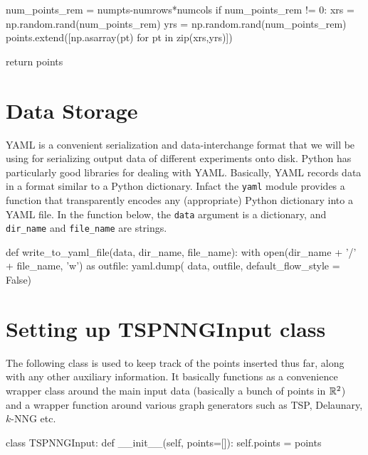      num_points_rem = numpts-numrows*numcols
     if num_points_rem != 0:
          xrs = np.random.rand(num_points_rem)
          yrs = np.random.rand(num_points_rem)
          points.extend([np.asarray(pt) for pt in zip(xrs,yrs)])
     
     return points
\nwendcode{}\nwdocspar

\section{Data Storage}
YAML\cite{ben2009yaml} is a convenient serialization and data-interchange format that we will be using 
for serializing output data of different experiments onto disk. Python has particularly good libraries for dealing with YAML. Basically, 
YAML records data in a format similar to a Python dictionary. Infact the \texttt{yaml} module provides a function that
transparently encodes any (appropriate) Python dictionary into a YAML file. In the function below, the 
\texttt{data} argument is a dictionary, and \texttt{dir\_name} and \texttt{file\_name} are strings. 
 
\nwenddocs{}\plusendmoddef\nwstartdeflinemarkup{}\nwenddeflinemarkup
def write_to_yaml_file(data, dir_name, file_name):
   with open(dir_name + '/' + file_name, 'w') as outfile:
          yaml.dump( data, outfile, default_flow_style = False)
\nwendcode{}\nwdocspar


\section{Setting up TSPNNGInput class}

The following class is used to keep track of the points inserted thus far, along with 
any other auxiliary information. It basically functions as a convenience wrapper class around 
the main input data (basically a bunch of points in $\mathbb{R}^2$) and a wrapper function around 
various graph generators such as TSP, Delaunary, $k\text{-}$NNG etc. 

\nwenddocs{}\plusendmoddef\nwstartdeflinemarkup{}\nwenddeflinemarkup
class TSPNNGInput:
      def __init__(self, points=[]):
          self.points            = points

